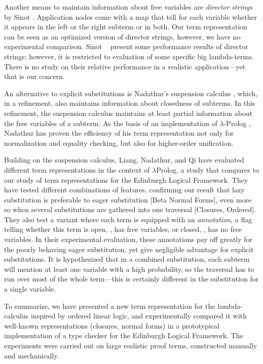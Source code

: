 \documentclass[submission,copyright,creativecommons]{eptcs}
\begin{document}
Another means to maintain information about free variables are
\emph{director strings} by Sinot \cite{sinot:jlc05}.  Application
nodes come with a map that tell for each variable whether it appears
in the left or the right subterm or in both.  Our term representation
can be seen as an optimized version of director strings, however, we
have no experimental comparison. 
Sinot \etal~\cite{fernandezMackieSinot:aaecc05} present some
performance results of director strings; however, it is restricted
to evaluation of some specific big lambda-terms.  There is no study on
their relative performance in a realistic application---yet that is
our concern.

An alternative to explicit substitutions is Nadathur's suspension
calculus \cite{nadathur:jflp99}, which, in a refinement, also
maintains information about closedness of subterms.  In this
refinement, the suspension calculus maintains at least partial
information about the free variables of a subterm.  
As the basis of an implementation of
$\lambda$-Prolog \cite{nadathur:flops01}, 
Nadathur has proven the efficiency of his term
representation not only for normalization and equality checking, but
also for higher-order unification.

Building on the suspension calculus,
Liang, Nadathur, and Qi \cite{liangNadathurQi:jar05} have evaluated
different term representations in the context of $\lambda$Prolog, a
study that compares to our study of term representations for the
Edinburgh Logical Framework.  They have tested different combinations
of features, confirming our result that lazy substitution is 
preferable to eager substitution {[Beta Normal Forms]},
even more so when several substitutions are gathered into one
traversal {[Closures, Ordered]}.  They also test a variant where
each term is equipped with an \emph{annotation}, a flag telling whether
this term is open, \ie, has free variables, or closed, \ie, has no
free variables.  In their experimental evaluation, these annotations
pay off greatly for the poorly behaving eager substitution, yet give
negligible advantage for explicit substitutions.  It is
hypothesized that in a combined substitution, each subterm will
mention at least one variable with a high probability, so the
traversal has to run over most of the whole term---this is certainly
different in the substitution for a single variable.

To summarize, we have presented a new term representation for the
lambda-calculus inspired by ordered linear logic, and experimentally
compared it with well-known representations (closures, normal forms)
in a prototypical implementation of a type checker for the Edinburgh
Logical Framework.  The experiments were carried out on large realistic
proof terms, constructed manually and mechanically.  
\end{document}
